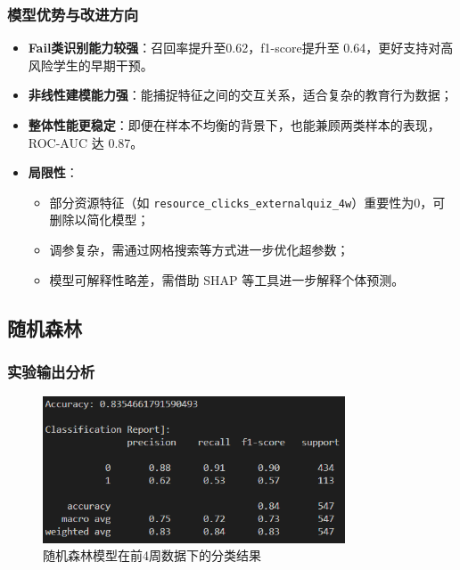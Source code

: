 \documentclass{SYSUReport}
\begin{document}
\subsubsection{模型优势与改进方向}

\begin{itemize}
    \item \textbf{Fail类识别能力较强}：召回率提升至0.62，f1-score提升至 0.64，更好支持对高风险学生的早期干预。
    \item \textbf{非线性建模能力强}：能捕捉特征之间的交互关系，适合复杂的教育行为数据；
    \item \textbf{整体性能更稳定}：即便在样本不均衡的背景下，也能兼顾两类样本的表现，ROC-AUC 达 0.87。
    \item \textbf{局限性}：
    \begin{itemize}
        \item 部分资源特征（如 \texttt{resource\_clicks\_externalquiz\_4w}）重要性为0，可删除以简化模型；
        \item 调参复杂，需通过网格搜索等方式进一步优化超参数；
        \item 模型可解释性略差，需借助 SHAP 等工具进一步解释个体预测。
    \end{itemize}
\end{itemize}


\subsection{随机森林}
\subsubsection{实验输出分析}

\begin{figure}[htbp]
    \centering
    \includegraphics[width=0.8\textwidth]{figures/RandomForest_result.png}
    \caption{随机森林模型在前4周数据下的分类结果}
    \label{fig:randomforest_result}
\end{figure}
\end{document}
